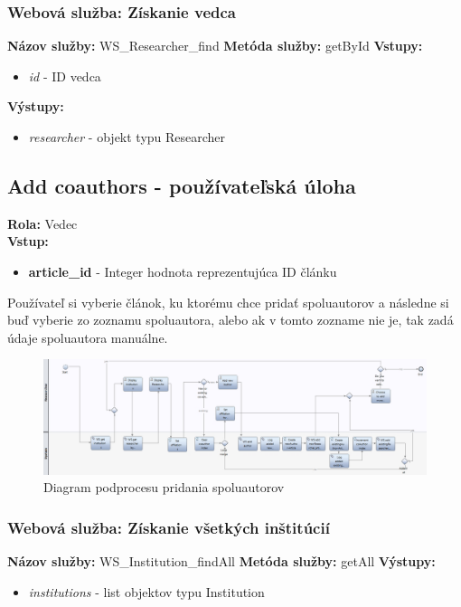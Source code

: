 \documentclass[10pt,oneside,slovak,a4paper]{article}
\begin{document}
\subsubsection{Webová služba: Získanie vedca}
\textbf{Názov služby:} WS\_Researcher\_find
\textbf{Metóda služby:} getById
\textbf{Vstupy:}
	\begin{itemize}
		\item \textit{id} - ID vedca
	\end{itemize}
\textbf{Výstupy:}
	\begin{itemize}
		\item \textit{researcher} - objekt typu Researcher
	\end{itemize}

\subsection{Add coauthors - používateľská úloha}
\textbf{Rola:} Vedec\\
\textbf{Vstup:}

\begin{itemize}
\item \textbf{article\_id} - Integer hodnota reprezentujúca ID článku
\end{itemize}

Používateľ si vyberie článok, ku ktorému chce pridať spoluautorov a následne si buď vyberie zo zoznamu spoluautora, alebo ak v tomto zozname nie je, tak zadá údaje spoluautora manuálne.

\begin{figure} [H]
\centering
\includegraphics[scale=0.4]{diagrams/diagAddCoauthors.jpg} 
\caption{Diagram podprocesu pridania spoluautorov}
\end{figure}

\subsubsection{Webová služba: Získanie všetkých inštitúcií}
\textbf{Názov služby:} WS\_Institution\_findAll
\textbf{Metóda služby:} getAll
\textbf{Výstupy:}
	\begin{itemize}
		\item \textit{institutions} - list objektov typu Institution
	\end{itemize}
	
\end{document}
